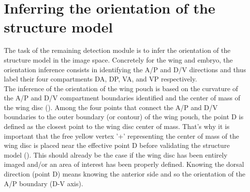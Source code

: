 

\section{Inferring the orientation of the structure model}\label{sec:orientation_inference}
The task of the remaining detection module is to infer the orientation of the structure model in the image space. Concretely for the \droso wing and embryo, the orientation inference consists in identifying the A/P and D/V directions and thus label their four compartments DA, DP, VA, and VP respectively.\\

The inference of the orientation of the wing pouch is based on the curvature of the A/P and D/V compartment boundaries identified and the center of mass of the wing disc (). Among the four points that connect the A/P and D/V boundaries to the outer boundary (or contour) of the wing pouch, the point D is defined as the closest point to the wing disc center of mass. That's why it is important that the free yellow vertex '+' representing the center of mass of the wing disc is placed near the effective point D before validating the structure model (). This should already be the case if the wing disc has been entirely imaged and/or an area of interest has been properly defined. Knowing the dorsal direction (point D) means knowing the anterior side and so the orientation of the A/P boundary (D-V axis).\\

